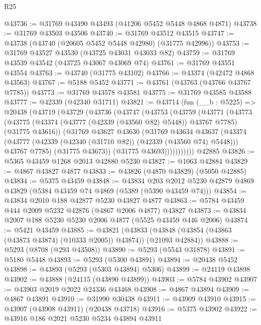 \begin{lexlean}{R25}
\begin{coremodule}
@43736 := @31769 @43490 @43493 (@41206 @5452 @5448 @4868 @4871)
@43738 := @31769 @43503 @43506
@43740 := @31769 @43512 @43515
@43747 := @43738 (@43740 (@20605 @5452 @5448 @42980) (@31775 @42996))
@43753 := @31769 @43527 @43530 (@43725 @43031 @43033 @82)
@43759 := @31769 @43539 @43542 (@43725 @43067 @43069 @74)
@43761 := @31769 @43551 @43554
@43763 := @43740 (@31775 @43102)
@43766 := @43374 (@42472 @4868 @43563)
@43767 := @5188 @5452
@43771 := @43761 (@43763 (@43766 @43767 @7785))
@43773 := @31769 @43578 @43581
@43775 := @31769 @43585 @43588
@43777 := @42339 (@42340 @31711)
@43821 := @43714
    (fun (__b : @5225) =>
    @20438
      (@43719
        (@43729
          (@43736
            (@43747
              (@43753
                (@43759
                  (@43771
                    (@43773
                      (@43775
                        (@43374 (@43777 (@42339 (@43560 @82) @5448)) @43767 @7785)
                        (@31775 @43616))
                      (@31769
                        @43627
                        @43630
                        (@31769
                          @43634
                          @43637
                          (@43374
                            (@43777 (@42339 (@42340 (@31710 @82)) (@42339 (@43560 @74) @5448)))
                            @43767
                            @7785)
                          (@31775 @43673))
                        (@31775 @43693)))))))))))
    @42885
@43826 := @5365 @43459 @1268 @2013 @42880 @5230
@43827 := @1063 @42884
@43829 := @4867 @43827 @4877
@43833 := @43826 (@4870 @43829) (@5050 @42885)
@43834 := @5375 @43459
@43848 := @43834
    @203
    @2012
    @5230
    @42879
    @4869
    @43829
    (@5384 @43459 @74 @4869 (@5389 (@5390 @43459 @74)))
@43854 := @43834 @2010 @188 @42877 @5230 @43827 @4877
@43863 := @5784 @43459 @444 @2009 @5232 @42876 (@4867 @2006 @4877) @43827
@43873 := @43834 @2007 @188 @5230 @5230 @2006 @4877 (@5525 @43459 @446 @2006)
@43874 := @5421 @43459
@43885 := @43821
    (@43833 (@43848 (@43854 (@43863 (@43873 @43874) (@10333 @2005)) @43874)) (@21093 @42884))
@43888 := @5293 (@8708 (@293 @43508))
@43890 := @5293 (@5543 @31878)
@43891 := @5180 @5448
@43893 := @5293 (@5300 @43891)
@43894 := @20438 @5452
@43898 := @43893 (@5293 (@5303 @43894) @5306)
@43899 := @24119 @43898
@43902 := @43888 (@24115 (@43890 @43899))
@43903 := @5784 @43902
@43907 := @43903 @2019 @2022 @24336 @43468
@43908 := @4867 @43894
@43909 := @4867 @43891
@43910 := @31990 @30438
@43911 := @43909 @43910
@43915 := @43907 (@43908 @43911) (@20438 @43718)
@43916 := @5375 @43902
@43922 := @43916 @186 @2021 @5230 @5234 @43894 @43911

\end{coremodule}
\end{lexlean}
